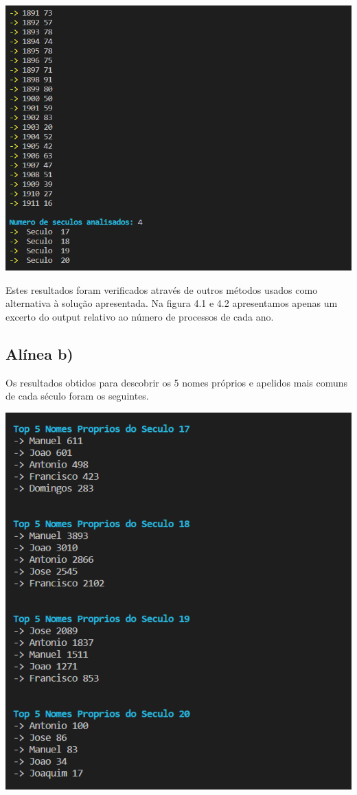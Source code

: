 \documentclass[11pt,a4paper]{report}
\begin{document}
	\begin{center}
	\includegraphics[scale=0.9]{images/a2}
	\end{center}

\qquad Estes resultados foram verificados através de outros métodos usados como alternativa à solução apresentada. Na figura 4.1 e 4.2 apresentamos apenas um excerto do output relativo ao número de processos de cada ano.
\newpage
\subsection*{ Alínea b)}

\qquad Os resultados obtidos para descobrir os 5 nomes próprios e apelidos mais comuns de cada século foram os seguintes.\par

\begin{center}
	\includegraphics[scale=0.6]{images/b1}
	\end{center}
\end{document}
